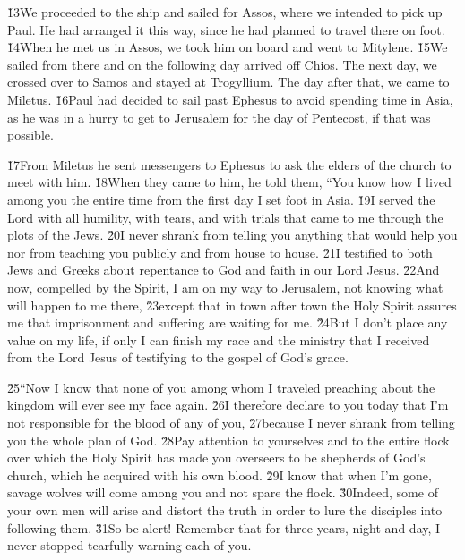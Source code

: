 \v{13}We proceeded to the ship and sailed for Assos, where we intended to pick up Paul. He had arranged it this way, since he had planned to travel there on foot. \v{14}When he met us in Assos, we took him on board and went to Mitylene. \v{15}We sailed from there and on the following day arrived off Chios. The next day, we crossed over to Samos and stayed at Trogyllium. The day after that, we came to Miletus. \v{16}Paul had decided to sail past Ephesus to avoid spending time in Asia, as he was in a hurry to get to Jerusalem for the day of Pentecost, if that was possible.

\v{17}From Miletus he sent messengers to Ephesus to ask the elders of the church to meet with him. \v{18}When they came to him, he told them, ``You know how I lived among you the entire time from the first day I set foot in Asia. \v{19}I served the Lord with all humility, with tears, and with trials that came to me through the plots of the Jews. \v{20}I never shrank from telling you anything that would help you nor from teaching you publicly and from house to house. \v{21}I testified to both Jews and Greeks about repentance to God and faith in our Lord Jesus. \v{22}And now, compelled by the Spirit, I am on my way to Jerusalem, not knowing what will happen to me there, \v{23}except that in town after town the Holy Spirit assures me that imprisonment and suffering are waiting for me. \v{24}But I don't place any value on my life, if only I can finish my race and the ministry that I received from the Lord Jesus of testifying to the gospel of God's grace.

\v{25}``Now I know that none of you among whom I traveled preaching about the kingdom will ever see my face again. \v{26}I therefore declare to you today that I'm not responsible for the blood of any of you, \v{27}because I never shrank from telling you the whole plan of God. \v{28}Pay attention to yourselves and to the entire flock over which the Holy Spirit has made you overseers to be shepherds of God's church, which he acquired with his own blood. \v{29}I know that when I'm gone, savage wolves will come among you and not spare the flock. \v{30}Indeed, some of your own men will arise and distort the truth in order to lure the disciples into following them. \v{31}So be alert! Remember that for three years, night and day, I never stopped tearfully warning each of you.

